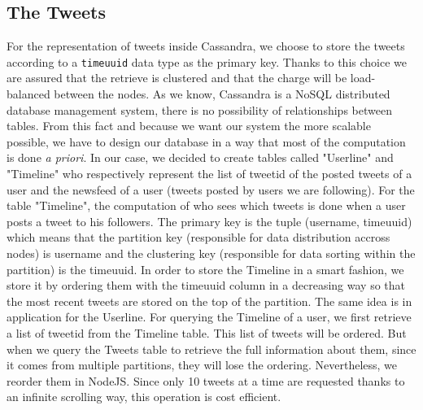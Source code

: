 \documentclass[conference,9pt]{IEEEtran}
\begin{document}
\subsection{The Tweets}
For the representation of tweets inside Cassandra, we choose to store the tweets according to a \texttt{timeuuid} data type as the primary key. Thanks to this choice we are assured that the retrieve is clustered and that the charge will be load-balanced between the nodes. As we know, Cassandra is a NoSQL distributed database management system, there is no possibility of relationships between tables. From this fact and because we want our system the more scalable possible, we have to design our database in a way that most of the computation is done \textit{a priori}. In our case, we decided to create tables called "Userline" and "Timeline" who respectively represent the list of tweetid of the posted tweets of a user and the newsfeed of a user (tweets posted by users we are following). For the table "Timeline", the computation of who sees which tweets is done when a user posts a tweet to his followers.
The primary key is the tuple (username, timeuuid) which means that the partition key (responsible for data distribution accross nodes) is username and the clustering key (responsible for data sorting within the partition) is the timeuuid. In order to store the Timeline in a smart fashion, we store it by ordering them with the timeuuid column in a decreasing way so that the most recent tweets are stored on the top of the partition. The same idea is in application for the Userline. For querying the Timeline of a user, we first retrieve a list of tweetid from the Timeline table. This list of tweets will be ordered. But when we query the Tweets table to retrieve the full information about them, since it comes from multiple partitions, they will lose the ordering. Nevertheless, we reorder them in NodeJS. Since only 10 tweets at a time are requested thanks to an infinite scrolling way, this operation is cost efficient.
\end{document}
